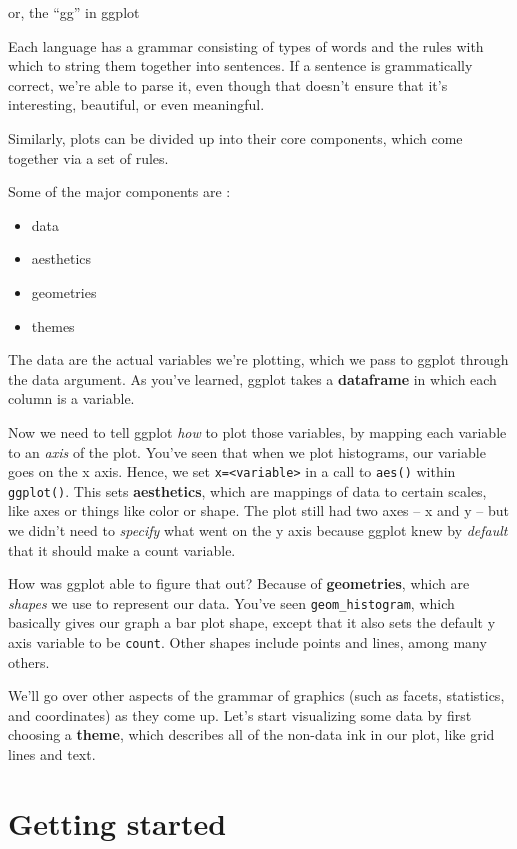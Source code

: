 \documentclass[12pt,]{book}
\providecommand{\tightlist}{%
  \setlength{\itemsep}{0pt}\setlength{\parskip}{0pt}}
\begin{document}
or, the ``gg'' in ggplot

Each language has a grammar consisting of types of words and the rules with which to string them together into sentences. If a sentence is grammatically correct, we're able to parse it, even though that doesn't ensure that it's interesting, beautiful, or even meaningful.

Similarly, plots can be divided up into their core components, which come together via a set of rules.

Some of the major components are :

\begin{itemize}
\tightlist
\item
  data
\item
  aesthetics
\item
  geometries
\item
  themes
\end{itemize}

The data are the actual variables we're plotting, which we pass to ggplot through the data argument. As you've learned, ggplot takes a \textbf{dataframe} in which each column is a variable.

Now we need to tell ggplot \emph{how} to plot those variables, by mapping each variable to an \emph{axis} of the plot. You've seen that when we plot histograms, our variable goes on the x axis. Hence, we set \texttt{x=\textless{}variable\textgreater{}} in a call to \texttt{aes()} within \texttt{ggplot()}. This sets \textbf{aesthetics}, which are mappings of data to certain scales, like axes or things like color or shape. The plot still had two axes -- x and y -- but we didn't need to \emph{specify} what went on the y axis because ggplot knew by \emph{default} that it should make a count variable.

How was ggplot able to figure that out? Because of \textbf{geometries}, which are \emph{shapes} we use to represent our data. You've seen \texttt{geom\_histogram}, which basically gives our graph a bar plot shape, except that it also sets the default y axis variable to be \texttt{count}. Other shapes include points and lines, among many others.

We'll go over other aspects of the grammar of graphics (such as facets, statistics, and coordinates) as they come up. Let's start visualizing some data by first choosing a \textbf{theme}, which describes all of the non-data ink in our plot, like grid lines and text.

\hypertarget{getting-started}{%
\section{Getting started}\label{getting-started}}
\end{document}
